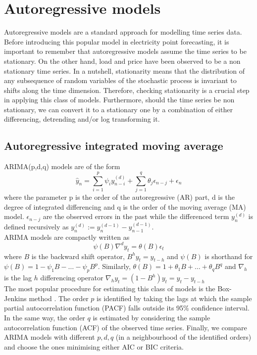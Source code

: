 \section{Autoregressive models}
Autoregressive models are a standard approach for modelling time series data.
Before introducing this popular model in electricity point forecasting, it is important to remember that autoregressive models assume the time series to be stationary. On the other hand, load and price have been observed to be a non stationary time series. 
In a nutshell, stationarity means that the distribution of any subsequence of random variables of the stochastic process is invariant to shifts along the time dimension.
Therefore, checking stationarity is a crucial step in applying this class of models. %
Furthermore, should the time series be non stationary, we can convert it to a stationary one by a combination of either differencing, detrending and/or log transforming it.
\subsection{Autoregressive integrated moving average}
ARIMA(p,d,q) models are of the form
\begin{equation}
    \hat{y}_n=\sum\limits_{i=1}^{p}\psi_i y_{n-i}^{(d)}+\sum\limits_{j=1}^{q}\theta_j \epsilon_{n-j}+\epsilon_n
\end{equation}
where the parameter p is the order of the autoregressive (AR) part, d is the degree of integrated differencing and q is the order of the moving average (MA) model. $\epsilon_{n-j}$ are the observed errors in the past while the differenced term $y_n^{(d)}$ is defined recursively as $y_n^{(d)}:=y_n^{(d-1)}-y_{n-1}^{(d-1)}$.
\\
ARIMA models are compactly written as
\begin{equation}
    \psi(B)\nabla^d y_t=\theta(B)\epsilon_t
\end{equation}
where $B$ is the backward shift operator, $B^h y_t=y_{t-h}$ and $\psi(B)$ is shorthand for $\psi(B)=1-\psi_1B-\dots-\psi_p B^p$.
Similarly, $\theta(B)=1+\theta_1B+\dots+\theta_q B^q$ and $\nabla_h$ is the lag $h$ differencing operator $\nabla_h y_t=(1-B^h)y_t=y_t-y_{t-h}$
\\
The most popular procedure for estimating this class of models is the Box-Jenkins method \cite{box2015time}.
The order $p$ is identified by taking the lags at which the sample partial autocorrelation function (PACF) falls outside its 95\% confidence interval.
In the same way, the order $q$ is estimated by considering the sample autocorrelation function (ACF) of the observed time series. Finally, we compare ARIMA models with different $p,d,q$ (in a neighbourhood of the identified orders) and choose the ones minimising either AIC or BIC criteria. 


